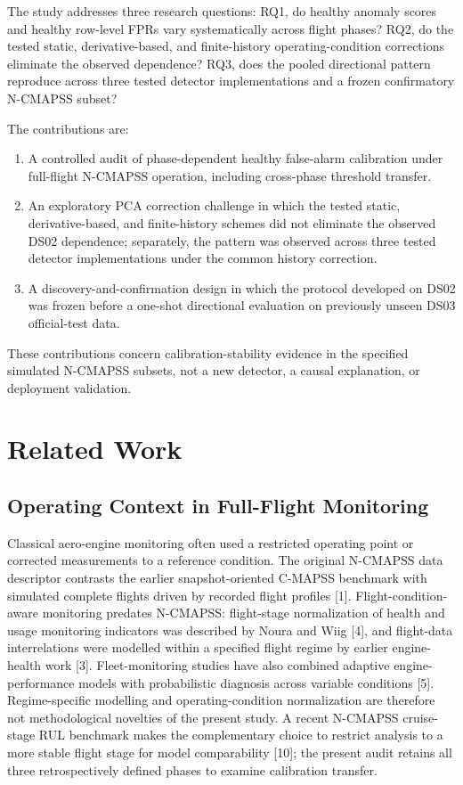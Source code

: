 \documentclass[10pt,twocolumn]{article}
\begin{document}
The study addresses three research questions: RQ1, do healthy anomaly scores and healthy row-level FPRs vary systematically across flight phases? RQ2, do the tested static, derivative-based, and finite-history operating-condition corrections eliminate the observed dependence? RQ3, does the pooled directional pattern reproduce across three tested detector implementations and a frozen confirmatory N-CMAPSS subset?

The contributions are:

\begin{enumerate}
\def\labelenumi{\arabic{enumi}.}
\tightlist
\item
  A controlled audit of phase-dependent healthy false-alarm calibration under full-flight N-CMAPSS operation, including cross-phase threshold transfer.
\item
  An exploratory PCA correction challenge in which the tested static, derivative-based, and finite-history schemes did not eliminate the observed DS02 dependence; separately, the pattern was observed across three tested detector implementations under the common history correction.
\item
  A discovery-and-confirmation design in which the protocol developed on DS02 was frozen before a one-shot directional evaluation on previously unseen DS03 official-test data.
\end{enumerate}

These contributions concern calibration-stability evidence in the specified simulated N-CMAPSS subsets, not a new detector, a causal explanation, or deployment validation.

\section{Related Work}\label{related-work}

\subsection{Operating Context in Full-Flight Monitoring}\label{operating-context-in-full-flight-monitoring}

Classical aero-engine monitoring often used a restricted operating point or corrected measurements to a reference condition. The original N-CMAPSS data descriptor contrasts the earlier snapshot-oriented C-MAPSS benchmark with simulated complete flights driven by recorded flight profiles {[}1{]}. Flight-condition-aware monitoring predates N-CMAPSS: flight-stage normalization of health and usage monitoring indicators was described by Noura and Wiig {[}4{]}, and flight-data interrelations were modelled within a specified flight regime by earlier engine-health work {[}3{]}. Fleet-monitoring studies have also combined adaptive engine-performance models with probabilistic diagnosis across variable conditions {[}5{]}. Regime-specific modelling and operating-condition normalization are therefore not methodological novelties of the present study. A recent N-CMAPSS cruise-stage RUL benchmark makes the complementary choice to restrict analysis to a more stable flight stage for model comparability {[}10{]}; the present audit retains all three retrospectively defined phases to examine calibration transfer.
\end{document}
